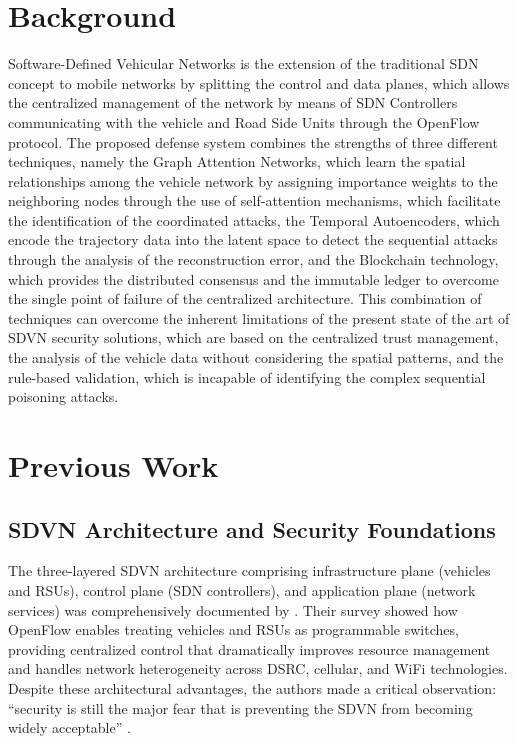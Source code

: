 \documentclass[12pt, a4paper]{report}
\begin{document}
\section{Background}
\label{background}
Software-Defined Vehicular Networks is the extension of the traditional SDN concept to mobile networks by splitting the control and data planes, which allows the centralized management of the network by means of SDN Controllers communicating with the vehicle and Road Side Units through the OpenFlow protocol. The proposed defense system combines the strengths of three different techniques, namely the Graph Attention Networks, which learn the spatial relationships among the vehicle network by assigning importance weights to the neighboring nodes through the use of self-attention mechanisms, which facilitate the identification of the coordinated attacks, the Temporal Autoencoders, which encode the trajectory data into the latent space to detect the sequential attacks through the analysis of the reconstruction error, and the Blockchain technology, which provides the distributed consensus and the immutable ledger to overcome the single point of failure of the centralized architecture. This combination of techniques can overcome the inherent limitations of the present state of the art of SDVN security solutions, which are based on the centralized trust management, the analysis of the vehicle data without considering the spatial patterns, and the rule-based validation, which is incapable of identifying the complex sequential poisoning attacks.

\section{Previous Work}
\label{sec:previous-work}

\subsection{SDVN Architecture and Security Foundations}
\label{subsec:sdvn-arch-security}

The three-layered SDVN architecture comprising infrastructure plane (vehicles and RSUs), control plane (SDN controllers), and application plane (network services) was comprehensively documented by \cite{bhatia2019}. Their survey showed how OpenFlow enables treating vehicles and RSUs as programmable switches, providing centralized control that dramatically improves resource management and handles network heterogeneity across DSRC, cellular, and WiFi technologies. Despite these architectural advantages, the authors made a critical observation: ``security is still the major fear that is preventing the SDVN from becoming widely acceptable'' \cite{bhatia2019}.
\end{document}
